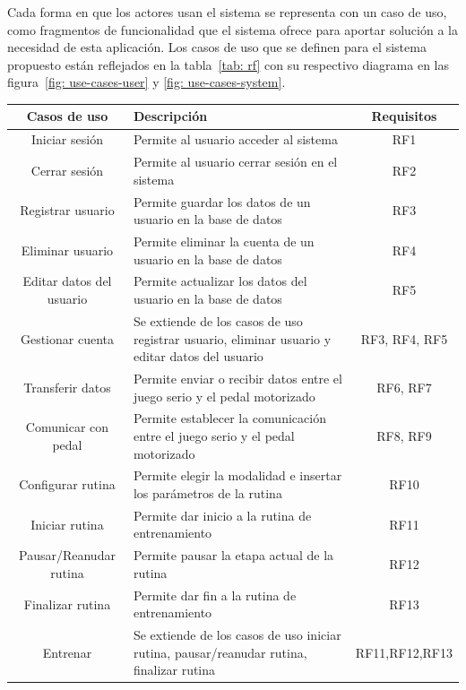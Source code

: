 Cada forma en que los actores usan el sistema se representa con un caso de uso, como fragmentos de funcionalidad que el sistema ofrece para aportar solución a la necesidad de esta aplicación. Los casos de uso que se definen para el sistema propuesto están reflejados en la tabla~\ref{tab: rf} con su respectivo diagrama en las figura~\ref{fig: use-cases-user} y \ref{fig: use-cases-system}.
\begin{table}[!ht]
    \centering
    \begin{tabularx}{\textwidth}{|c|X|c|}
        \hline
        \textbf{Casos de uso} & \textbf{Descripción} & \textbf{Requisitos}\\\hline
        Iniciar sesión & Permite al usuario acceder al sistema & RF1\\\hline
        Cerrar sesión & Permite al usuario cerrar sesión en el sistema & RF2\\\hline
        Registrar usuario & Permite guardar los datos de un usuario en la base de datos & RF3\\\hline
        Eliminar usuario & Permite eliminar la cuenta de un usuario en la base de datos & RF4\\\hline
        Editar datos del usuario & Permite actualizar los datos del usuario en la base de datos & RF5\\\hline
        Gestionar cuenta  & Se extiende de los casos de uso registrar usuario, eliminar usuario y editar datos del usuario & RF3, RF4, RF5 \\\hline
        Transferir datos & Permite enviar o recibir datos entre el juego serio y el pedal motorizado & RF6, RF7\\\hline
        Comunicar con pedal & Permite establecer la comunicación entre el juego serio y el pedal motorizado & RF8, RF9\\\hline
        Configurar rutina & Permite elegir la modalidad e insertar los parámetros de la rutina  & RF10\\\hline
        Iniciar rutina & Permite dar inicio a la rutina de entrenamiento & RF11\\\hline
        Pausar/Reanudar rutina & Permite pausar la etapa actual de la rutina & RF12\\\hline
        Finalizar rutina & Permite dar fin a la rutina de entrenamiento & RF13\\\hline
        Entrenar & Se extiende de los casos de uso  iniciar rutina, pausar/reanudar rutina, finalizar rutina&RF11,RF12,RF13\\\hline

\end{tabularx}
\end{table}
